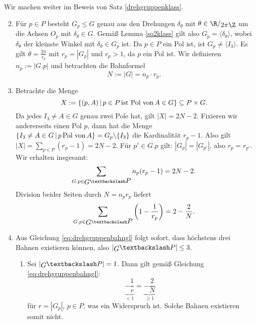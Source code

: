 \begin{beweis}
Wir machen weiter im Beweis von Satz \ref{drehgruppenklass}. 
\begin{enumerate}
\setcounter{enumi}{1}
\item Für $p \in P$ besteht $G_p \leq G$ genau aus den Drehungen $\delta_\theta$ mit $\theta \in \quotient{\R}{2\pi \Z}$ um die Achsen $O_p$ mit $\delta_\theta \in G$. Gemäß Lemma \ref{so2klass} gilt also $G_p = \langle \delta_\theta \rangle$, wobei $\delta_\theta$ der kleinste Winkel mit $\delta_\theta \in G_p$ ist. Da $p \in P$ ein Pol ist, ist $G_p \neq \langle I_3 \rangle$. Es gilt $\theta = \frac{2\pi}{r_p}$ mit $r_p = |G_p|$ und $r_p > 1$, da $p$ ein Pol ist. Wir definieren $n_p := |G.p|$ und betrachten die Bahnformel
\begin{equation}
N:=|G| = n_p \cdot r_p.
\end{equation}
\item Betrachte die Menge
\begin{equation}
X := \{(p,A)\,|\, p \in P \, \text{ist Pol von} \, A \in G\} \subseteq P \times G.
\end{equation}
Da jedes $I_3 \neq A \in G$ genau zwei Pole hat, gilt $|X| = 2N-2$. Fixieren wir andererseits einen Pol $p$, dann hat die Menge $\{I_3 \neq A \in G \, | \, p \, \text{Pol von} \, A \} = G_p \backslash \{I_3\}$ die Kardinalität $r_p-1$. Also gilt $|X| = \sum_{p \in P} (r_p -1) = 2N-2$. Für $p' \in G.p$ gilt: $|G_p| = |G_{p'}|$, also $r_p = r_{p'}$. Wir erhalten insgesamt:
\begin{equation}
\sum_{G.p \in \invquotient{G}{P}} n_p(r_p-1) = 2N-2.
\end{equation}
Division beider Seiten durch $N = n_pr_p$ liefert
\begin{equation}
\label{eq:drehgruppenbahngl}
\sum_{G.p \in \invquotient{G}{P}} \left(1- \frac{1}{r_p}\right) = 2-\frac{2}{N}.
\end{equation}
\item Aus Gleichung \ref{eq:drehgruppenbahngl} folgt sofort, dass höchstens drei Bahnen existieren können, also $\left|\invquotient{G}{P}\right| \leq 3$.
\begin{enumerate}[1. {Fall}:]
\item Sei $\left|\invquotient{G}{P}\right| =1$. Dann gilt gemäß Gleichung \ref{eq:drehgruppenbahngl}: 
\begin{equation}
\underbrace{-\frac{1}{r}}_{<1} = \underbrace{-\frac{2}{N}}_{\geq 1}
\end{equation}
für $r = |G_p|$, $p \in P$, was ein Widerspruch ist. Solche Bahnen existieren somit nicht.

\end{enumerate}
\end{enumerate}
\end{beweis}
